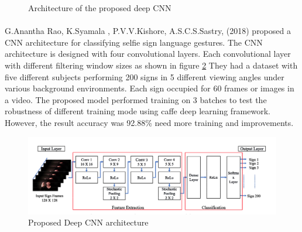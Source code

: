 \documentclass[12pt]{report}
\begin{document}
\begin{figure}
\begin{subfigure}[b]{0.3\textwidth}
                    \end{subfigure}
                    \caption{Architecture of the proposed deep CNN }\label{fig:tiny_architecture}
                \end{figure}
                \newpage
                \paragraph{}
                G.Anantha Rao, K.Syamala , P.V.V.Kishore, A.S.C.S.Sastry, (2018)
                proposed a CNN architecture for classifying selfie sign language gestures. 
                The CNN architecture is designed with four convolutional layers. Each convolutional 
                layer with different filtering window sizes as shown in figure \ref{fig:selfie}  
                They had a dataset with five different subjects performing 200 signs in 5 different viewing angles 
                under various background environments. Each sign occupied for 60 frames or images in a video.
                The proposed model performed training on 3 batches to test the robustness of different training mode 
                using caffe deep learning framework. However, the result accuracy was 92.88\% need more training and improvements. 
    
                    \begin{figure}
                        \centering
                        \includegraphics[width=\textwidth]{./images/selfie.png}
                        \caption{Proposed Deep CNN architecture}\label{fig:selfie}
                    \end{figure}
    
\end{document}
